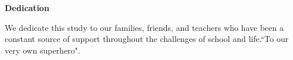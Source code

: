 \begin{center}
	\textbf{Dedication}
\end{center}

We dedicate this study to our families, friends, and teachers who have been a constant source of support throughout the challenges of school and life.``To our very own superhero".
